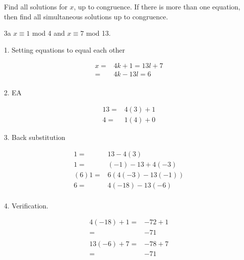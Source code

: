 
\begin{question}{3}
Find all solutions for $x$, up to congruence. If there is more than one equation, then find all simultaneous solutions up to congruence.
\end{question}


\begin{question}{3a}
$x \equiv 1$ mod 4 and $x \equiv 7$ mod 13.

1. Setting equations to equal each other

\begin{align*}
x =& 4k + 1 = 13l + 7\\
=&   4k -13l = 6\\
\end{align*}

2. EA

\begin{align*}
13 =& 4(3) + 1\\
4  =& 1(4) + 0
\end{align*}

3. Back substitution

\begin{align*}
1 =& 13 - 4(3)\\
1=& (-1)-13 + 4(-3)\\
(6)1=& 6(4(-3) -13(-1))\\
6=& 4(-18) - 13(-6)\\
\end{align*}

4. Verification.

\begin{align*}
4(-18)+1 =& -72 +1\\
=& -71 \\
\end{align*}
\begin{align*}
13(-6) + 7 =& -78 + 7 \\
=& -71 \\
\end{align*}
\end{question}

